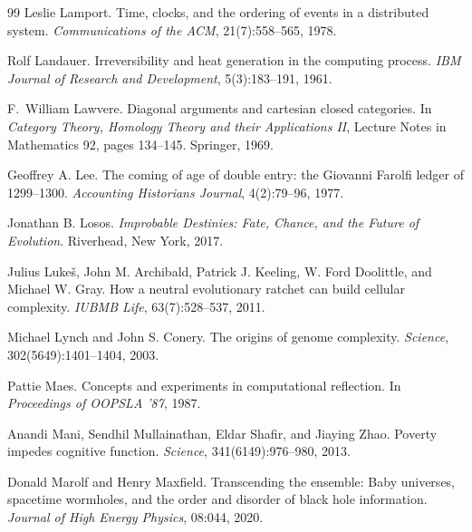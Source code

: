 \documentclass[11pt,a4paper]{article}
\theoremstyle{remark}\newtheorem{remark}[definition]{Remark}
\begin{document}
\begin{thebibliography}{99}
Leslie Lamport.
\newblock Time, clocks, and the ordering of events in a distributed system.
\newblock \emph{Communications of the ACM}, 21(7):558--565, 1978.

Rolf Landauer.
\newblock Irreversibility and heat generation in the computing process.
\newblock \emph{IBM Journal of Research and Development}, 5(3):183--191, 1961.

F.~William Lawvere.
\newblock Diagonal arguments and cartesian closed categories.
\newblock In \emph{Category Theory, Homology Theory and their Applications II}, Lecture Notes in Mathematics 92, pages 134--145. Springer, 1969.

Geoffrey A. Lee.
\newblock The coming of age of double entry: the Giovanni Farolfi ledger of 1299--1300.
\newblock \emph{Accounting Historians Journal}, 4(2):79--96, 1977.

Jonathan B. Losos.
\newblock \emph{Improbable Destinies: Fate, Chance, and the Future of Evolution}.
\newblock Riverhead, New York, 2017.

Julius Luke\v{s}, John M. Archibald, Patrick J. Keeling, W. Ford Doolittle, and Michael W. Gray.
\newblock How a neutral evolutionary ratchet can build cellular complexity.
\newblock \emph{IUBMB Life}, 63(7):528--537, 2011.

Michael Lynch and John S. Conery.
\newblock The origins of genome complexity.
\newblock \emph{Science}, 302(5649):1401--1404, 2003.

Pattie Maes.
\newblock Concepts and experiments in computational reflection.
\newblock In \emph{Proceedings of OOPSLA '87}, 1987.

Anandi Mani, Sendhil Mullainathan, Eldar Shafir, and Jiaying Zhao.
\newblock Poverty impedes cognitive function.
\newblock \emph{Science}, 341(6149):976--980, 2013.

Donald Marolf and Henry Maxfield.
\newblock Transcending the ensemble: Baby universes, spacetime wormholes, and the order and disorder of black hole information.
\newblock \emph{Journal of High Energy Physics}, 08:044, 2020.


\end{thebibliography}
\end{document}
